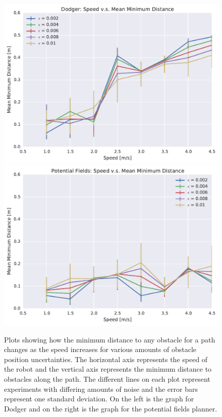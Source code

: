 \documentclass[letterpaper, 10pt, conference]{ieeeconf}
\begin{document}
\begin{figure}[h!]
    \centering
    \includegraphics[width=0.48\linewidth]{figs/planner_mean_min_distance_0}
    \includegraphics[width=0.48\linewidth]{figs/pf_mean_min_distance_0}

    \caption{Plots showing how the minimum distance to any obstacle for a path
        changes as the speed increases for various amounts of obstacle position
        uncertainties.  The horizontal axis represents the speed of the robot
        and the vertical axis represents the minimum distance to obstacles
        along the path. The different lines on each plot represent experiments
    with differing amounts of noise and the error bars represent one standard
deviation. On the left is the graph for Dodger and on the right is the graph
for the potential fields planner.}

    \label{fig:plot_min_distance}
\end{figure}
\end{document}
